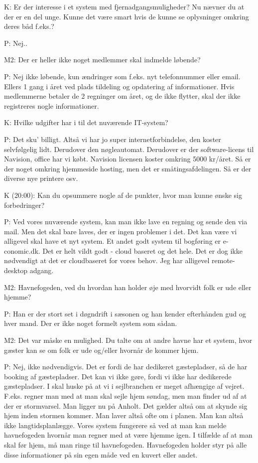 \documentclass{article}
\begin{document}
K: Er der interesse i et system med fjernadgangsmuligheder? Nu nævner du at der er en del unge. Kunne det være smart hvis de kunne se oplysninger omkring deres båd f.eks.?

P: Nej..

M2: Der er heller ikke noget medlemmer skal indmelde løbende?

P: Nej ikke løbende, kun ændringer som f.eks. nyt telefonnummer eller email. Ellers 1 gang i året ved plads tildeling og opdatering af informationer. Hvis medlemmerne betaler de 2 regninger om året, og de ikke flytter, skal der ikke registreres nogle informationer.

K: Hvilke udgifter har i til det nuværende IT-system?

P: Det sku' billigt. Altså vi har jo super internetforbindelse, den koster selvfølgelig lidt. Derudover den nøgleautomat. Derudover er der software-licens til Navision, office har vi købt. Navision licensen koster omkring 5000 kr/året. Så er der noget omkring hjemmeside hosting, men det er småtingsafdelingen. Så er der diverse nye printere osv.


K (20:00): Kan du opsummere nogle af de punkter, hvor man kunne ønske sig forbedringer?

P: Ved vores nuværende system, kan man ikke lave en regning og sende den via mail. Men det skal bare laves, der er ingen problemer i det. Det kan være vi alligevel skal have et nyt system. Et andet godt system til bogføring er e-conomic.dk. Det er helt vildt godt - cloud baseret og det hele. Det er dog ikke nødvendigt at det er cloudbaseret for vores behov. Jeg har alligevel remote-desktop adgang.

M2: Havnefogeden, ved du hvordan han holder øje med hvorvidt folk er ude eller hjemme?

P: Han er der stort set i døgndrift i sæsonen og han kender efterhånden gud og hver mand. Der er ikke noget formelt system som sådan.

M2: Det var måske en mulighed. Du talte om at andre havne har et system, hvor gæster kan se om folk er ude og/eller hvornår de kommer hjem.

P: Nej, ikke nødvendigvis. Det er fordi de har dedikeret gæstepladser, så de har booking af gæstepladser. Det kan vi ikke gøre, fordi vi ikke har dedikerede gæstepladser. I skal huske på at vi i sejlbranchen er meget afhængige af vejret. F.eks. regner man med at man skal sejle hjem søndag, men man finder ud af at der er stormvarsel. Man ligger nu på Anholt. Det gælder altså om at skynde sig hjem inden stormen kommer. Man laver altså ofte om i planen. Man kan altså ikke langtidsplanlægge. Vores system fungerere så ved at man kan melde havnefogeden hvornår man regner med at være hjemme igen. I tilfælde af at man skal før hjem, må man ringe til havnefogeden. Havnefogeden holder styr på alle disse informationer på sin egen måde ved en kuvert eller andet.
\end{document}
